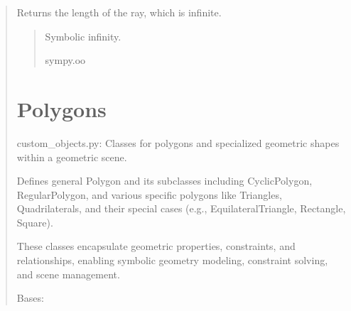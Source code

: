 \documentclass[letterpaper,10pt,english]{sphinxmanual}
\begin{document}
\begin{quote}
\begin{fulllineitems}
\begin{fulllineitems}
\label{\detokenize{pygeox:pygeox.basic_objects.Ray.length}}
\pysigstartsignatures
\pysigline
{}
\pysigstopsignatures
\sphinxAtStartPar
Returns the length of the ray, which is infinite.
\begin{quote}\begin{description}
\sphinxAtStartPar
Symbolic infinity.

\sphinxAtStartPar
sympy.oo

\end{description}\end{quote}

\end{fulllineitems}


\end{fulllineitems}



\chapter{Polygons}
\label{\detokenize{pygeox:module-pygeox.custom_objects}}\label{\detokenize{pygeox:polygons}}
\sphinxAtStartPar
custom\_objects.py: Classes for polygons and specialized geometric shapes within a geometric scene.

\sphinxAtStartPar
Defines general Polygon and its subclasses including CyclicPolygon, RegularPolygon,
and various specific polygons like Triangles, Quadrilaterals, and their special cases
(e.g., EquilateralTriangle, Rectangle, Square).

\sphinxAtStartPar
These classes encapsulate geometric properties, constraints, and relationships,
enabling symbolic geometry modeling, constraint solving, and scene management.

\begin{fulllineitems}
\label{\detokenize{pygeox:pygeox.custom_objects.AcuteTriangle}}
\pysigstartsignatures
\pysiglinewithargsret
{}
{\sphinxparamcomma {}\sphinxparamcomma {}\sphinxparamcomma {}\sphinxparamcomma {}\sphinxparamcomma {}}
{}
\pysigstopsignatures
\sphinxAtStartPar
Bases: 


\end{fulllineitems}
\end{quote}
\end{document}
